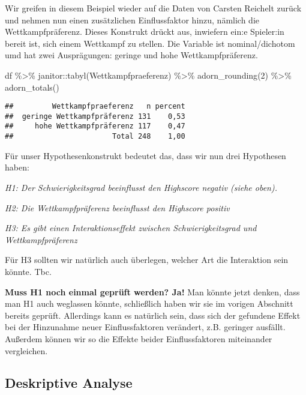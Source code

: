 \documentclass[
]{book}
\newenvironment{Shaded}{\begin{snugshade}}{\end{snugshade}}
\newcommand{\DecValTok}[1]{\textcolor[rgb]{0.00,0.00,0.81}{#1}}
\newcommand{\FunctionTok}[1]{\textcolor[rgb]{0.00,0.00,0.00}{#1}}
\newcommand{\NormalTok}[1]{#1}
\newcommand{\SpecialCharTok}[1]{\textcolor[rgb]{0.00,0.00,0.00}{#1}}
\begin{document}
Wir greifen in diesem Beispiel wieder auf die Daten von Carsten Reichelt zurück und nehmen nun einen zusätzlichen Einflussfaktor hinzu, nämlich die Wettkampfpräferenz. Dieses Konstrukt drückt aus, inwiefern ein:e Spieler:in bereit ist, sich einem Wettkampf zu stellen. Die Variable ist nominal/dichotom umd hat zwei Ausprägungen: geringe und hohe Wettkampfpräferenz.

\begin{Shaded}
\begin{Highlighting}[]
\NormalTok{df }\SpecialCharTok{\%\textgreater{}\%} 
\NormalTok{  janitor}\SpecialCharTok{::}\FunctionTok{tabyl}\NormalTok{(Wettkampfpraeferenz) }\SpecialCharTok{\%\textgreater{}\%} 
  \FunctionTok{adorn\_rounding}\NormalTok{(}\DecValTok{2}\NormalTok{) }\SpecialCharTok{\%\textgreater{}\%} 
  \FunctionTok{adorn\_totals}\NormalTok{() }
\end{Highlighting}
\end{Shaded}

\begin{verbatim}
##         Wettkampfpraeferenz   n percent
##  geringe Wettkampfpräferenz 131    0,53
##     hohe Wettkampfpräferenz 117    0,47
##                       Total 248    1,00
\end{verbatim}

Für unser Hypothesenkonstrukt bedeutet das, dass wir nun drei Hypothesen haben:

\emph{H1: Der Schwierigkeitsgrad beeinflusst den Highscore negativ (siehe oben).}

\emph{H2: Die Wettkampfpräferenz beeinflusst den Highscore positiv}

\emph{H3: Es gibt einen Interaktionseffekt zwischen Schwierigkeitsgrad und Wettkampfpräferenz}

Für H3 sollten wir natürlich auch überlegen, welcher Art die Interaktion sein könnte. Tbc.

\leavevmode\hypertarget{info_interactionanova}{}%
\textbf{Muss H1 noch einmal geprüft werden? Ja!}
Man könnte jetzt denken, dass man H1 auch weglassen könnte, schließlich haben wir sie im vorigen Abschnitt bereits geprüft. Allerdings kann es natürlich sein, dass sich der gefundene Effekt bei der Hinzunahme neuer Einflussfaktoren verändert, z.B. geringer ausfällt. Außerdem können wir so die Effekte beider Einflussfaktoren miteinander vergleichen.

\hypertarget{deskriptive-analyse-1}{%
\subsection{Deskriptive Analyse}\label{deskriptive-analyse-1}}
\end{document}
